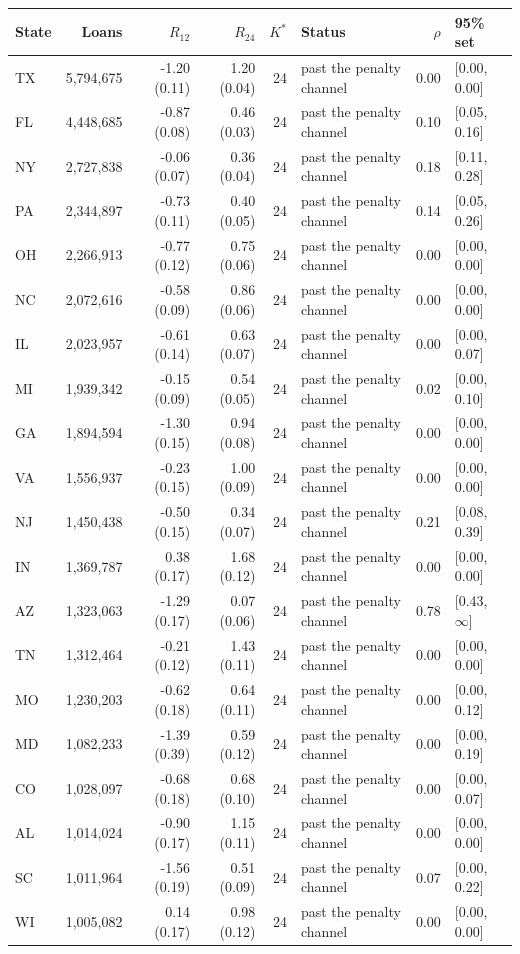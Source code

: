 \begin{tabular}{lrrrrlrl}
\toprule
State & Loans & $R_{12}$ & $R_{24}$ & $K^*$ & Status & $\rho$ & 95\% set \\
\midrule
TX & 5,794,675 & -1.20 (0.11) & 1.20 (0.04) & 24 & past the penalty channel & 0.00 & [0.00, 0.00] \\
FL & 4,448,685 & -0.87 (0.08) & 0.46 (0.03) & 24 & past the penalty channel & 0.10 & [0.05, 0.16] \\
NY & 2,727,838 & -0.06 (0.07) & 0.36 (0.04) & 24 & past the penalty channel & 0.18 & [0.11, 0.28] \\
PA & 2,344,897 & -0.73 (0.11) & 0.40 (0.05) & 24 & past the penalty channel & 0.14 & [0.05, 0.26] \\
OH & 2,266,913 & -0.77 (0.12) & 0.75 (0.06) & 24 & past the penalty channel & 0.00 & [0.00, 0.00] \\
NC & 2,072,616 & -0.58 (0.09) & 0.86 (0.06) & 24 & past the penalty channel & 0.00 & [0.00, 0.00] \\
IL & 2,023,957 & -0.61 (0.14) & 0.63 (0.07) & 24 & past the penalty channel & 0.00 & [0.00, 0.07] \\
MI & 1,939,342 & -0.15 (0.09) & 0.54 (0.05) & 24 & past the penalty channel & 0.02 & [0.00, 0.10] \\
GA & 1,894,594 & -1.30 (0.15) & 0.94 (0.08) & 24 & past the penalty channel & 0.00 & [0.00, 0.00] \\
VA & 1,556,937 & -0.23 (0.15) & 1.00 (0.09) & 24 & past the penalty channel & 0.00 & [0.00, 0.00] \\
NJ & 1,450,438 & -0.50 (0.15) & 0.34 (0.07) & 24 & past the penalty channel & 0.21 & [0.08, 0.39] \\
IN & 1,369,787 & 0.38 (0.17) & 1.68 (0.12) & 24 & past the penalty channel & 0.00 & [0.00, 0.00] \\
AZ & 1,323,063 & -1.29 (0.17) & 0.07 (0.06) & 24 & past the penalty channel & 0.78 & [0.43, $\infty$] \\
TN & 1,312,464 & -0.21 (0.12) & 1.43 (0.11) & 24 & past the penalty channel & 0.00 & [0.00, 0.00] \\
MO & 1,230,203 & -0.62 (0.18) & 0.64 (0.11) & 24 & past the penalty channel & 0.00 & [0.00, 0.12] \\
MD & 1,082,233 & -1.39 (0.39) & 0.59 (0.12) & 24 & past the penalty channel & 0.00 & [0.00, 0.19] \\
CO & 1,028,097 & -0.68 (0.18) & 0.68 (0.10) & 24 & past the penalty channel & 0.00 & [0.00, 0.07] \\
AL & 1,014,024 & -0.90 (0.17) & 1.15 (0.11) & 24 & past the penalty channel & 0.00 & [0.00, 0.00] \\
SC & 1,011,964 & -1.56 (0.19) & 0.51 (0.09) & 24 & past the penalty channel & 0.07 & [0.00, 0.22] \\
WI & 1,005,082 & 0.14 (0.17) & 0.98 (0.12) & 24 & past the penalty channel & 0.00 & [0.00, 0.00] \\
\bottomrule
\end{tabular}
